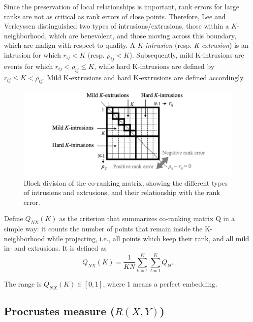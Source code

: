 \documentclass[11pt,a4paper,]{article}
\begin{document}
Since the preservation of local relationships is important, rank errors for large ranks are not as critical as rank errors of close points.
Therefore, Lee and Verleyssen distinguished two types of intrusions/extrusions, those within a \(K\)-neighborhood, which are benevolent, and those moving across this boundary, which are malign with respect to quality.
A \emph{K-intrusion} (resp. \emph{K-extrusion}) is an intrusion for which \(r_{ij} < K\) (resp. \(\rho_{ij} < K\)).
Subsequently, mild K-intrusions are events for which \(r_{ij} < \rho_{ij} \leq K\), while hard K-intrusions are defined by \(r_{ij} \leq K < \rho_{ij}\). Mild K-extrusions and hard K-extrusions are defined accordingly.

\begin{figure}

{\centering \includegraphics[width=1\linewidth]{figures/coRanking2} 

}

\caption{Block division of the co-ranking matrix, showing the different types of intrusions and extrusions, and their relationship with the rank error.}\label{fig:Kins}
\end{figure}

Define \(Q_{NX}(K)\) as the criterion that summarizes co-ranking matrix \(\mathrm{Q}\) in a simple way: it counts the number of points that remain inside the K-neighborhood while projecting, i.e., all points which keep their rank, and all mild in- and extrusions. It is defined as
\begin{equation}
\label{Q_NX}
Q_{NX}(K)=\frac{1}{K N} \sum_{k=1}^{K} \sum_{l=1}^{K} Q_{k l}.
\end{equation}

The range is \(Q_{N X}(K) \in[0,1]\), where 1 means a perfect embedding.

\hypertarget{procrustes-measure-rxy}{%
\subsection{\texorpdfstring{Procrustes measure (\(R(X,Y)\))}{Procrustes measure (R(X,Y))}}\label{procrustes-measure-rxy}}
\end{document}
